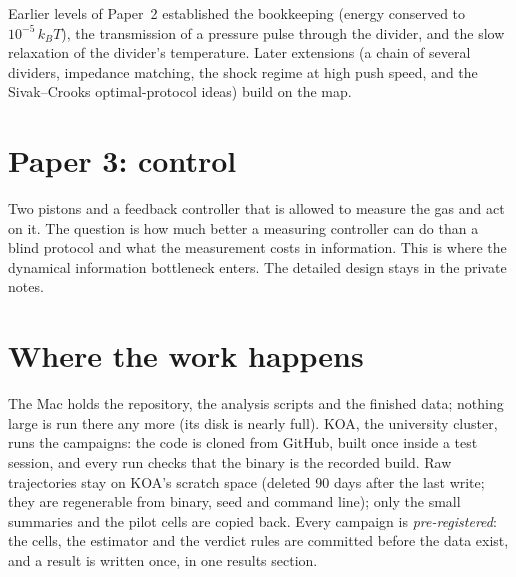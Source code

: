 \documentclass[11pt]{article}
\begin{document}
Earlier levels of Paper~2 established the bookkeeping (energy conserved to $10^{-5}\,k_B T$), the transmission of a pressure pulse through the divider, and the slow relaxation of the divider's temperature. Later extensions (a chain of several dividers, impedance matching, the shock regime at high push speed, and the Sivak--Crooks optimal-protocol ideas) build on the map.

\section{Paper 3: control}
Two pistons and a feedback controller that is allowed to measure the gas and act on it. The question is how much better a measuring controller can do than a blind protocol and what the measurement costs in information. This is where the dynamical information bottleneck enters. The detailed design stays in the private notes.

\section{Where the work happens}
The Mac holds the repository, the analysis scripts and the finished data; nothing large is run there any more (its disk is nearly full). KOA, the university cluster, runs the campaigns: the code is cloned from GitHub, built once inside a test session, and every run checks that the binary is the recorded build. Raw trajectories stay on KOA's scratch space (deleted 90 days after the last write; they are regenerable from binary, seed and command line); only the small summaries and the pilot cells are copied back. Every campaign is \emph{pre-registered}: the cells, the estimator and the verdict rules are committed before the data exist, and a result is written once, in one results section.
\end{document}
